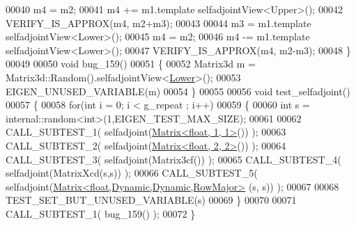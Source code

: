 \begin{DoxyCode}
00040   m4 = m2;
00041   m4 += m1.template selfadjointView<Upper>();
00042   VERIFY\_IS\_APPROX(m4, m2+m3);
00043 
00044   m3 = m1.template selfadjointView<Lower>();
00045   m4 = m2;
00046   m4 -= m1.template selfadjointView<Lower>();
00047   VERIFY\_IS\_APPROX(m4, m2-m3);
00048 \}
00049 
00050 \textcolor{keywordtype}{void} bug\_159()
00051 \{
00052   Matrix3d m = Matrix3d::Random().selfadjointView<\hyperlink{group__enums_gga39e3366ff5554d731e7dc8bb642f83cda891792b8ed394f7607ab16dd716f60e6}{Lower}>();
00053   EIGEN\_UNUSED\_VARIABLE(m)
00054 \}
00055 
00056 \textcolor{keywordtype}{void} test\_selfadjoint()
00057 \{
00058   \textcolor{keywordflow}{for}(\textcolor{keywordtype}{int} i = 0; i < g\_repeat ; i++)
00059   \{
00060     \textcolor{keywordtype}{int} s = internal::random<int>(1,EIGEN\_TEST\_MAX\_SIZE);
00061 
00062     CALL\_SUBTEST\_1( selfadjoint(\hyperlink{group___core___module_class_eigen_1_1_matrix}{Matrix<float, 1, 1>}()) );
00063     CALL\_SUBTEST\_2( selfadjoint(\hyperlink{group___core___module_class_eigen_1_1_matrix}{Matrix<float, 2, 2>}()) );
00064     CALL\_SUBTEST\_3( selfadjoint(Matrix3cf()) );
00065     CALL\_SUBTEST\_4( selfadjoint(MatrixXcd(s,s)) );
00066     CALL\_SUBTEST\_5( selfadjoint(\hyperlink{group___core___module_class_eigen_1_1_matrix}{Matrix<float,Dynamic,Dynamic,RowMajor>}
      (s, s)) );
00067     
00068     TEST\_SET\_BUT\_UNUSED\_VARIABLE(s)
00069   \}
00070   
00071   CALL\_SUBTEST\_1( bug\_159() );
00072 \}
\end{DoxyCode}

